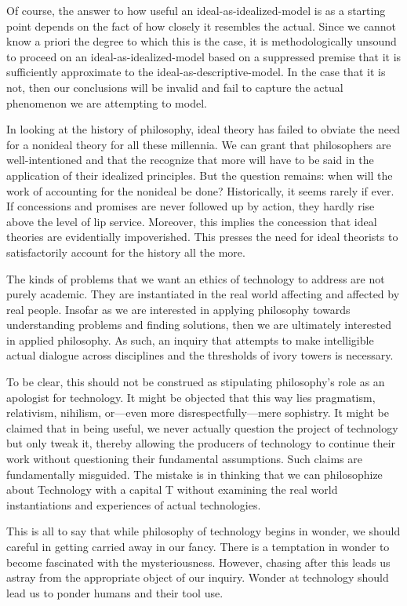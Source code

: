 \documentclass[12pt, letterpaper]{article}
\begin{document}
Of course, the answer to how useful an ideal-as-idealized-model is as a starting
point depends on the fact of how closely it resembles the actual.
Since we cannot know a priori the degree to which this is the case, it is
methodologically unsound to proceed on an ideal-as-idealized-model based on a
suppressed premise that it is sufficiently approximate to the
ideal-as-descriptive-model.
In the case that it is not, then our conclusions will be invalid and fail to
capture the actual phenomenon we are attempting to model.

In looking at the history of philosophy, ideal theory has failed to obviate the
need for a nonideal theory for all these millennia.
We can grant that philosophers are well-intentioned and that the recognize that
more will have to be said in the application of their idealized principles.
But the question remains: when will the work of accounting for the nonideal be
done?
Historically, it seems rarely if ever.
If concessions and promises are never followed up by action, they hardly rise
above the level of lip service.
Moreover, this implies the concession that ideal theories are evidentially
impoverished.
This presses the need for ideal theorists to satisfactorily account for the
history all the more.

The kinds of problems that we want an ethics of technology to address are not
purely academic.
They are instantiated in the real world affecting and affected by real people.
Insofar as we are interested in applying philosophy towards understanding
problems and finding solutions, then we are ultimately interested in applied
philosophy.
As such, an inquiry that attempts to make intelligible actual
dialogue across disciplines and the thresholds of ivory towers is necessary.

To be clear, this should not be construed as stipulating philosophy's role as an
apologist for technology.
It might be objected that this way lies pragmatism, relativism, nihilism,
or---even more disrespectfully---mere sophistry.
It might be claimed that in being useful, we never actually question the project
of technology but only tweak it, thereby allowing the producers of technology to
continue their work without questioning their fundamental assumptions.
Such claims are fundamentally misguided.
The mistake is in thinking that we can philosophize about
Technology with a capital T without examining the real world
instantiations and experiences of actual technologies.

This is all to say that while philosophy of technology begins in wonder, we
should careful in getting carried away in our fancy.
There is a temptation in wonder to become fascinated with the mysteriousness.
However, chasing after this leads us astray from the appropriate object of our
inquiry.
Wonder at technology should lead us to ponder humans and their tool use.
\end{document}
